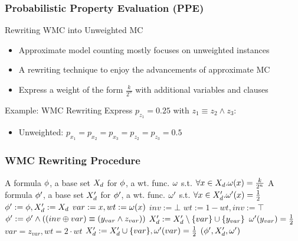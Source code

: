 \begin{frame}
  \frametitle{Probabilistic Property Evaluation (PPE)}
  \begin{block}{Rewriting WMC into Unweighted MC}
    \begin{itemize}
      \item Approximate model counting mostly focuses on unweighted instances
            \pause
      \item A rewriting technique to enjoy the advancements of approximate MC
            \pause
      \item Express a weight of the form $\frac{k}{2^n}$ with additional variables and clauses
    \end{itemize}
  \end{block}
  \pause
  \begin{block}{Example: WMC Rewriting}
    Express $p_{z_1}=0.25$ with $z_1\equiv z_2\land z_3$:
    \begin{figure}
      \centering
      
    \end{figure}
    \pause
    \begin{itemize}
      \item Unweighted: $p_{x_1}=p_{x_2}=p_{x_3}=p_{z_2}=p_{z_3}=0.5$
    \end{itemize}
  \end{block}
\end{frame}

\begin{frame}
  \frametitle{WMC Rewriting Procedure}
  {
    \scriptsize
    \begin{algorithmic}[1]
      \REQUIRE A formula $\phi$, a base set $X_d$ for $\phi$,
      a wt. func. $\omega$ s.t. $\forall x\in X_d.\omega(x)=\frac{k}{2^n}$
      \ENSURE A formula $\phi'$, a base set $X_d'$ for $\phi'$,
      a wt. func. $\omega'$ s.t. $\forall x\in X_d'.\omega'(x)=\frac{1}{2}$
      \STATE $\phi':=\phi,X_d':=X_d$
      \STATE $var:=x,wt:=\omega(x)$
      \STATE $inv:=\bot$
      \STATE $wt:=1-wt,inv:=\top$
      \ENDIF
      \STATE $\phi':=\phi'\land((inv \oplus var) \equiv (y_{var} \land z_{var}))$
      \STATE $X_d':=X_d'\setminus\{var\}\cup\{y_{var}\}$
      \STATE $\omega'(y_{var})=\frac{1}{2}$
      \STATE $var=z_{var},wt=2 \cdot wt$
      \ENDWHILE
      \STATE $X_d':=X_d'\cup\{var\},\omega'(var)=\frac{1}{2}$
      \ENDFOR
      \RETURN $(\phi',X_d',\omega')$
    \end{algorithmic}
  }
\end{frame}